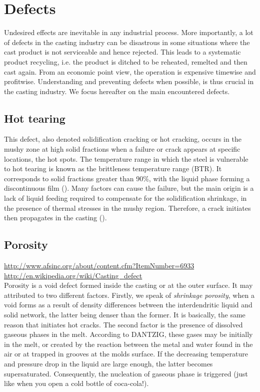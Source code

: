 \section*{Defects}
Undesired effects are inevitable in any industrial process. More importantly, a lot of defects in the casting industry can be disastrous in some situations where the cast product is not serviceable and hence rejected. This leads to a systematic product recycling, i.e. the product is ditched to be reheated, remelted and then cast again. From an economic point view, the operation is expensive timewise and profitwise. Understanding and preventing defects when possible, is thus crucial in the casting industry.
We focus hereafter on the main encountered defects.

\subsection*{Hot tearing}
This defect, also denoted solidification cracking or hot cracking, occurs in the mushy zone at high solid fractions when a failure
or crack appears at specific locations, the hot spots. The temperature range in which the steel is vulnerable to hot tearing is known as the brittleness temperature range (BTR). It corresponds to solid fractions greater than \num{90}\%, with the liquid phase forming a discontinuous film (). Many factors can cause the failure, but the main origin is a lack of liquid feeding required to compensate for the solidification shrinkage, in the presence of thermal stresses in the mushy region. Therefore, a crack initiates then propagates in the casting (). 

\subsection*{Porosity}
\url{http://www.afsinc.org/about/content.cfm?ItemNumber=6933} \\
\url{http://en.wikipedia.org/wiki/Casting_defect} \\
Porosity is a void defect formed inside the casting or at the outer surface. It may attributed to two different factors.
Firstly, we speak of \emph{shrinkage porosity}, when a void forms as a result of density differences between the interdendritic liquid and solid
network, the latter being denser than the former. It is basically, the same reason that initiates hot cracks. 
The second factor is the presence of dissolved gaseous phases in the melt. According to DANTZIG, these gases may be initially in the melt, or created 
by the reaction between the metal and water found in the air or at trapped in grooves at the molds surface. If the decreasing temperature and pressure drop in the liquid are large enough, the latter becomes supersaturated. Consequently, the nucleation of gaseous phase is triggered (just like when you open a cold bottle of coca-cola!).


